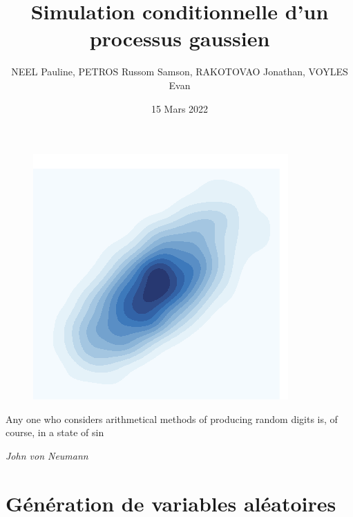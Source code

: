 \documentclass[10pt]{article} %
\title{Simulation conditionnelle d’un processus gaussien}
\author{NEEL Pauline, PETROS Russom Samson, RAKOTOVAO Jonathan, VOYLES Evan}
\date{15 Mars 2022}
\begin{document}
\begin{titlepage}

\maketitle

\begin{figure}[h!]
    \centering
    \includegraphics{media/plot.png}
\end{figure}

\vspace{3cm}





\epigraph{Any one who considers arithmetical methods of producing random digits is, of course, in a state of sin}
 {\textit{John von Neumann}}

\newpage

\end{titlepage}

\pagestyle{fancy}

\section{Génération de variables aléatoires}
\end{document}
